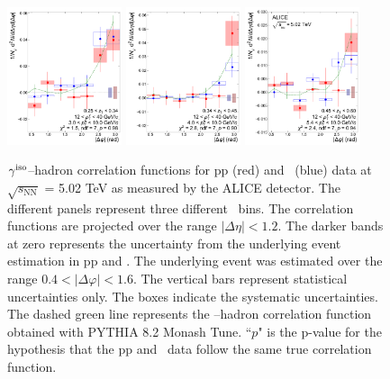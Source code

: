 \begin{figure}
    \includegraphics[width=0.3\textwidth]{Data_Analysis/gammahadron/Cs_Final_Indv_pT_0_zT_5.pdf}        
    \includegraphics[width=0.3\textwidth]{Data_Analysis/gammahadron/Cs_Final_Indv_pT_0_zT_6.pdf}        
    \includegraphics[width=0.3\textwidth]{Data_Analysis/gammahadron/Cs_Final_Indv_pT_0_zT_7.pdf}
    \caption{$\gamma^\mathrm{iso}$--hadron correlation functions for pp (red) and \pPb~(blue) data at $\sqrt{s_\mathrm{NN}}$ = 5.02 TeV as measured by the ALICE detector. The different panels represent three different \zt~bins. The correlation functions are projected over the range $|\Delta\eta| < 1.2$. The darker bands at zero represents the uncertainty from the underlying event estimation in pp and \pPb. The underlying event was estimated over the range $0.4 <|\Delta\varphi| < 1.6$. The vertical bars represent statistical uncertainties only. The boxes indicate the systematic uncertainties. The dashed green line represents the \gammaiso--hadron correlation function obtained with \textsc{PYTHIA 8.2} Monash Tune. ``$p$" is the p-value for the hypothesis that the pp and \pPb~data follow the same true correlation function.
    }
     \label{fig:GH_Correlations}
 \end{figure}
\FloatBarrier

